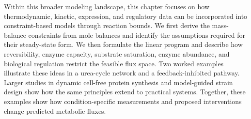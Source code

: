 Within this broader modeling landscape, this chapter focuses on how
thermodynamic, kinetic, expression, and regulatory data can be incorporated
into constraint-based models through reaction bounds.
We first derive the mass-balance constraints from mole balances and identify
the assumptions required for their steady-state form. We then formulate the
linear program and describe how reversibility, enzyme capacity, substrate saturation,
enzyme abundance, and biological regulation restrict the feasible flux space.
Two worked examples illustrate these ideas in a urea-cycle network and a
feedback-inhibited pathway. Larger studies in dynamic cell-free protein
synthesis \cite{Dai2018,Vilkhovoy2023} and model-guided strain design
\cite{Wayman2019,Burgard2003} show how the same principles extend to practical
systems. Together, these examples show how condition-specific measurements
and proposed interventions change predicted metabolic fluxes.

